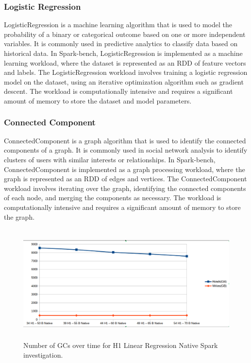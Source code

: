 \subsubsection{Logistic Regression}
LogisticRegression is a machine learning algorithm that is used to
model the probability of a binary or categorical outcome based on one
or more independent variables. It is commonly used in predictive
analytics to classify data based on historical data. In Spark-bench,
LogisticRegression is implemented as a machine learning workload,
where the dataset is represented as an RDD of feature vectors and
labels. The LogisticRegression workload involves training a logistic
regression model on the dataset, using an iterative optimization
algorithm such as gradient descent. The workload is computationally
intensive and requires a significant amount of memory to store the
dataset and model parameters.

\subsubsection{Connected Component}
ConnectedComponent is a graph algorithm that is used to identify the
connected components of a graph. It is commonly used in social network
analysis to identify clusters of users with similar interests or
relationships. In Spark-bench, ConnectedComponent is implemented as a
graph processing workload, where the graph is represented as an RDD of
edges and vertices. The ConnectedComponent workload involves iterating
over the graph, identifying the connected components of each node, and
merging the components as necessary. The workload is computationally
intensive and requires a significant amount of memory to store the
graph.


\begin{figure}[ht!]
    \includegraphics[width=12cm,height=6cm]{./fig/gcs_linr_h1_native.png}
    \caption{Number of GCs over time for H1 Linear Regression Native
    Spark investigation.}
    \label{fig:gcs_linr_h1_native}
\end{figure}

